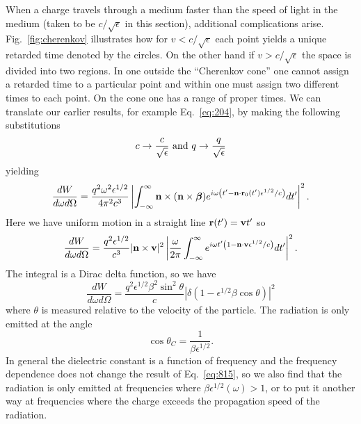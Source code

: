 When a charge travels through a medium faster than the speed of light
in the medium (taken to be $c/\sqrt{\epsilon}$ in this section),
additional complications arise.  Fig.~\ref{fig:cherenkov} illustrates
how for $v<c/\sqrt{\epsilon}$ each point yields a unique retarded time
denoted by the circles.  On the other hand if $v>c/\sqrt{\epsilon}$
the space is divided into two regions.  In one outside the ``Cherenkov
cone'' one cannot assign a retarded time to a particular point and
within one must assign two different times to each point.  On the cone
one has a range of proper times.  We can translate our earlier
results, for example Eq.~\ref{eq:204}, by making the following
substitutions
\begin{equation}
c \rightarrow \frac{c}{\sqrt{\epsilon}}~\hbox{\rm and}~q \rightarrow \frac{q}{\sqrt{\epsilon}}
\end{equation}
yielding
\begin{equation}
\frac{d W}{d\omega d\Omega} = \frac{q^2 \omega^2 \epsilon^{1/2}}{4\pi^2 c^3} 
\left | \int_{-\infty}^\infty {\bf n} \times ({\bf n} \times \mbox{\boldmath $\beta$}) e^{i
  \omega \left ( t'- {\bf n} \cdot {\bf r}_0 (t') \epsilon^{1/2} / c \right )} dt'
\right |^2.
\label{eq:826}
\end{equation}
Here we have uniform motion in a straight line ${\bf r}(t')={\bf v}
t'$ so
\begin{equation}
\frac{d W}{d\omega d\Omega} = \frac{q^2 \epsilon^{1/2}}{c^3} 
|{\bf n} \times {\bf v}|^2 
\left | \frac{\omega}{2\pi} \int_{-\infty}^\infty e^{i
  \omega t' \left ( 1 - {\bf n} \cdot {\bf v} \epsilon^{1/2} / c \right )} dt'
\right |^2.
\label{eq:827}
\end{equation}
The integral is a Dirac delta function, so we have
\begin{equation}
\frac{d W}{d\omega d\Omega} = \frac{q^2 \epsilon^{1/2} \beta^2 \sin^2
  \theta}{c} 
\left | \delta ( 1 - \epsilon^{1/2} \beta \cos \theta)\right |^2
\label{eq:815}
\end{equation}
where $\theta$ is measured relative to the velocity of the particle.
The radiation is only emitted at the angle
\begin{equation}
\cos \theta_C = \frac{1}{\beta \epsilon^{1/2}}.
\end{equation}
In general the dielectric constant is a function of frequency and the
frequency dependence does not change the result of Eq.~\ref{eq:815},
so we also find that the radiation is only emitted 
at frequencies where $\beta\epsilon^{1/2}(\omega) > 1$, or to put it another
way at frequencies where the charge exceeds the propagation speed of
the radiation.

